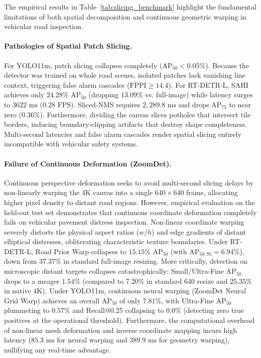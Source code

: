 \documentclass[runningheads]{llncs}
\begin{document}
The empirical results in Table~\ref{tab:slicing_benchmark} highlight the fundamental limitations of both spatial decomposition and continuous geometric warping in vehicular road inspection.

\paragraph{Pathologies of Spatial Patch Slicing.} For YOLO11m, patch slicing collapses completely ($\text{AP}_{50} < 0.05\%$). Because the detector was trained on whole road scenes, isolated patches lack vanishing line context, triggering false alarm cascades ($\text{FPPI} \ge 14.4$). For RT-DETR-L, SAHI achieves only $24.28\% \text{ AP}_{50}$ (dropping $13.09\%$ vs. full-image) while latency surges to $3622\text{ ms}$ ($0.28\text{ FPS}$). Sliced-NMS requires $2,289.8\text{ ms}$ and drops $\text{AP}_{75}$ to near zero ($0.36\%$). Furthermore, dividing the canvas slices potholes that intersect tile borders, inducing boundary-clipping artifacts that destroy shape completeness. Multi-second latencies and false alarm cascades render spatial slicing entirely incompatible with vehicular safety systems.

\paragraph{Failure of Continuous Deformation (ZoomDet).} Continuous perspective deformation seeks to avoid multi-second slicing delays by non-linearly warping the 4K canvas into a single $640\times 640$ frame, allocating higher pixel density to distant road regions. However, empirical evaluation on the held-out test set demonstrates that continuous coordinate deformation completely fails on vehicular pavement distress inspection. Non-linear coordinate warping severely distorts the physical aspect ratios ($w/h$) and edge gradients of distant elliptical distresses, obliterating characteristic texture boundaries. Under RT-DETR-L, Road Prior Warp collapses to $15.15\% \text{ AP}_{50}$ (with $\text{AP}_{50:95} = 6.94\%$), down from $37.37\%$ in standard full-image resizing. More critically, detection on microscopic distant targets collapses catastrophically: Small/Ultra-Fine $\text{AP}_{50}$ drops to a meager $\mathbf{1.54\%}$ (compared to $7.20\%$ in standard 640 resize and $25.35\%$ in native 4K). Under YOLO11m, continuous neural warping (ZoomDet Neural Grid Warp) achieves an overall $\text{AP}_{50}$ of only $7.81\%$, with Ultra-Fine $\text{AP}_{50}$ plummeting to $\mathbf{0.57\%}$ and Recall@0.25 collapsing to $\mathbf{0.0\%}$ (detecting zero true positives at the operational threshold). Furthermore, the computational overhead of non-linear mesh deformation and inverse coordinate mapping incurs high latency ($85.3\text{ ms}$ for neural warping and $389.9\text{ ms}$ for geometry warping), nullifying any real-time advantage.
\end{document}
